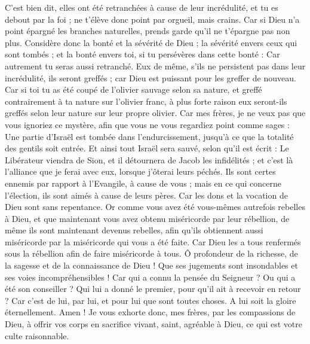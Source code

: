 \begin{multicols}{2}
C'est bien dit, elles ont été retranchées à cause de leur incrédulité, et tu es debout par la foi ; ne t'élève donc point par orgueil, mais crains.
Car si Dieu n'a point épargné les branches naturelles, prends garde qu'il ne t'épargne pas non plus.
Considère donc la bonté et la sévérité de Dieu ; la sévérité envers ceux qui sont tombés ; et la bonté envers toi, si tu persévères dans cette bonté : Car autrement tu seras aussi retranché.
Eux de même, s'ils ne persistent pas dans leur incrédulité, ils seront greffés ; car Dieu est puissant pour les greffer de nouveau.
Car si toi tu as été coupé de l'olivier sauvage selon sa nature, et greffé contrairement à ta nature sur l'olivier franc, à plus forte raison eux seront-ils greffés selon leur nature sur leur propre olivier.
Car mes frères, je ne veux pas que vous ignoriez ce mystère, afin que vous ne vous regardiez point comme sages : Une partie d’Israël est tombée dans l’endurcissement, jusqu’à ce que la totalité des gentils soit entrée.
Et ainsi tout Israël sera sauvé, selon qu’il est écrit : Le Libérateur viendra de Sion, et il détournera de Jacob les infidélités ;
et c'est là l'alliance que je ferai avec eux, lorsque j'ôterai leurs péchés.
Ils sont certes ennemis par rapport à l'Evangile, à cause de vous ; mais en ce qui concerne l’élection, ils sont aimés à cause de leurs pères.
Car les dons et la vocation de Dieu sont sans repentance.
Or comme vous avez été vous-mêmes autrefois rebelles à Dieu, et que maintenant vous avez obtenu miséricorde par leur rébellion,
de même ils sont maintenant devenus rebelles, afin qu’ils obtiennent aussi miséricorde par la miséricorde qui vous a été faite.
Car Dieu les a tous renfermés sous la rébellion afin de faire miséricorde à tous.
Ô profondeur de la richesse, de la sagesse et de la connaissance de Dieu ! Que ses jugements sont insondables et ses voies incompréhensibles !
Car qui a connu la pensée du Seigneur ? Ou qui a été son conseiller ?
Qui lui a donné le premier, pour qu’il ait à recevoir en retour ?
Car c’est de lui, par lui, et pour lui que sont toutes choses. A lui soit la gloire éternellement. Amen !
\VerseOne{}Je vous exhorte donc, mes frères, par les compassions de Dieu, à offrir vos corps en sacrifice vivant, saint, agréable à Dieu, ce qui est votre culte raisonnable.

\end{multicols}
